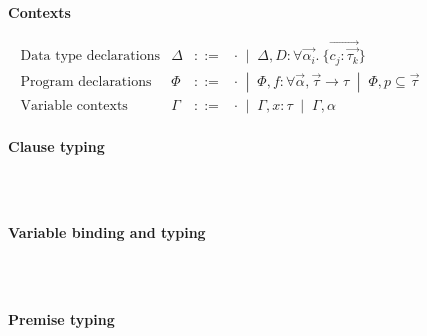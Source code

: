 \documentclass[acmsmall,screen,nonacm]{acmart}
\newcommand{\BNFALT}{\;\;|\;\;}
\newcommand{\hdr}[2]{%
\flushleft
\textbf{#1} \hfill {#2} \\
\centering
}
\theoremstyle{definition}
\begin{document}
\begin{figure}[t]

  \hdr{Contexts}{}
  \vspace{-10pt}
  \[ \begin{array}{lrcl}
    \text{Data type declarations} & \Delta &::=& \cdot \BNFALT \Delta, D:\forall \vec{\alpha_i}. ~ \{ \overrightarrow{c_j : \vec{\tau_k}} \} \\
    \text{Program declarations}  & \Phi   &::=&
      \cdot \BNFALT
      \Phi, f:\forall \vec{\alpha}, \vec{\tau} \rightarrow \tau \BNFALT
      \Phi, p \subseteq \vec{\tau} \\
    \text{Variable contexts}    & \Gamma &::=&
      \cdot \BNFALT
      \Gamma, x:\tau \BNFALT
      \Gamma, \alpha \\
  \end{array} \]

  \hdr{Clause typing}{
    \quad \fbox{$\implicit{\Delta; \Phi}  \vdash H$}
  }
  
  ~ \\[0.25em]
  

  ~ \\[0.25em]

  \hdr{Variable binding and typing}{
    \quad \fbox{$\Gamma \vdash x,\tau \rhd \Gamma$}
    \quad \fbox{$\Gamma \vdash \vec{x},\vec{\tau} \rhd \Gamma$}
  }

  ~ \\[0.25em]

  \sidebyside
   {
  }{
  }

  ~ \\[0.25em]

  \hdr{Premise typing}{
    \quad \fbox{$\implicit{\Delta; \Phi; {}} \Gamma \vdash P \rhd \Gamma$}
  }
  
  ~ \\[0.25em]



\end{figure}
\end{document}
